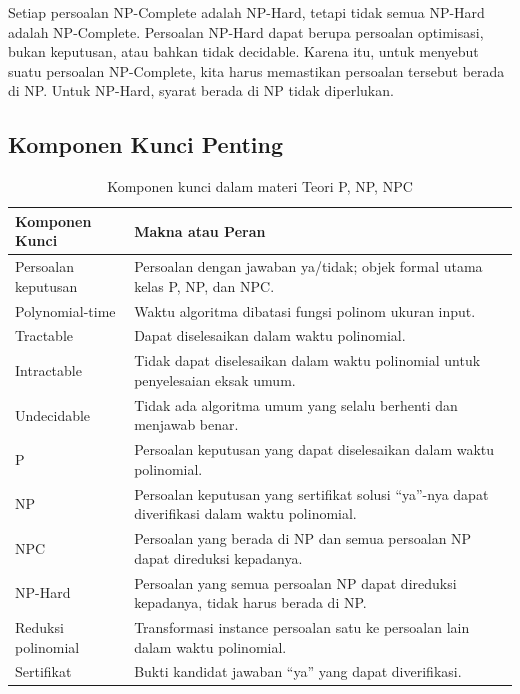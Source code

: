 Setiap persoalan NP-Complete adalah NP-Hard, tetapi tidak semua NP-Hard adalah NP-Complete. Persoalan NP-Hard dapat berupa persoalan optimisasi, bukan keputusan, atau bahkan tidak decidable. Karena itu, untuk menyebut suatu persoalan NP-Complete, kita harus memastikan persoalan tersebut berada di NP. Untuk NP-Hard, syarat berada di NP tidak diperlukan.

\subsection{Komponen Kunci Penting}

\begin{table}[H]
\centering
\begin{tabularx}{\textwidth}{|L{0.28\textwidth}|X|}
\hline
\textbf{Komponen Kunci} & \textbf{Makna atau Peran} \\
\hline
Persoalan keputusan & Persoalan dengan jawaban ya/tidak; objek formal utama kelas P, NP, dan NPC. \\
\hline
Polynomial-time & Waktu algoritma dibatasi fungsi polinom ukuran input. \\
\hline
Tractable & Dapat diselesaikan dalam waktu polinomial. \\
\hline
Intractable & Tidak dapat diselesaikan dalam waktu polinomial untuk penyelesaian eksak umum. \\
\hline
Undecidable & Tidak ada algoritma umum yang selalu berhenti dan menjawab benar. \\
\hline
P & Persoalan keputusan yang dapat diselesaikan dalam waktu polinomial. \\
\hline
NP & Persoalan keputusan yang sertifikat solusi ``ya''-nya dapat diverifikasi dalam waktu polinomial. \\
\hline
NPC & Persoalan yang berada di NP dan semua persoalan NP dapat direduksi kepadanya. \\
\hline
NP-Hard & Persoalan yang semua persoalan NP dapat direduksi kepadanya, tidak harus berada di NP. \\
\hline
Reduksi polinomial & Transformasi instance persoalan satu ke persoalan lain dalam waktu polinomial. \\
\hline
Sertifikat & Bukti kandidat jawaban ``ya'' yang dapat diverifikasi. \\
\hline
\end{tabularx}
\caption{Komponen kunci dalam materi Teori P, NP, NPC}
\label{tab:komponen-kunci-p-np-npc}
\end{table}

